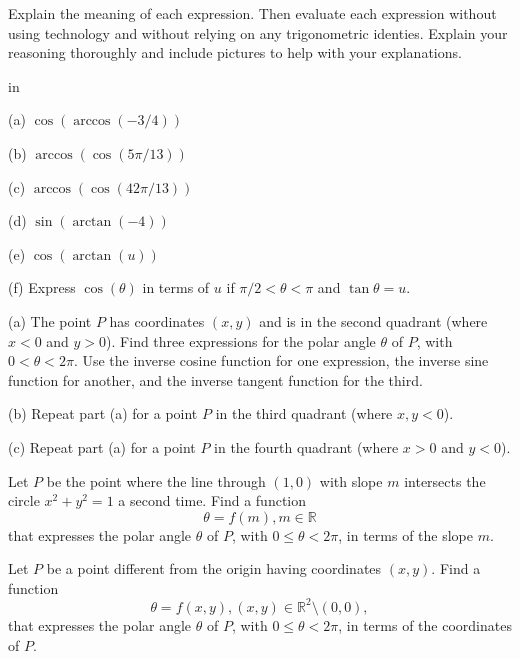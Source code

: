 \documentclass{ximera}
\newcommand{\pskip}{\vskip 0.1 in}
\begin{document}
\begin{question}   \label{Q17:InverseTrig}
Explain the meaning of each expression. Then evaluate each expression without using technology and without relying on any trigonometric identies. Explain your reasoning thoroughly and include pictures to help with your explanations.

\pskip

(a) $\cos (\arccos(-3/4))$ 

(b) $\arccos(\cos (5\pi/13))$

(c) $\arccos(\cos (42\pi/13))$

(d) $\sin(\arctan (-4))$

(e) $\cos(\arctan (u))$

(f) Express $\cos (\theta)$ in terms of $u$  if $\pi/2 < \theta < \pi$ and $\tan \theta=u$.

\end{question} 


\begin{question} \label{Q18:InverseTrig}
(a) The point $P$ has coordinates $(x,y)$ and is in the second quadrant (where $x<0$ and $y>0$). Find three expressions for the polar angle $\theta$ of $P$, with $0 < \theta < 2\pi$. Use the inverse cosine function for one expression, the inverse sine function for another, and the inverse tangent function for the third. 

(b) Repeat part (a) for a point $P$ in the third quadrant (where $x,y<0$).

(c) Repeat part (a) for a point $P$ in the fourth quadrant (where $x>0$ and $y<0$).
\end{question}



\begin{question} \label{Q19:InverseTrig}
Let $P$ be the point where the line through $(1,0)$ with slope $m$ intersects the circle $x^2+y^2=1$ a second time. Find a function 
\[
      \theta = f(m) , m \in \mathbb{R}
\] 
that expresses the polar angle $\theta$ of $P$, with $0 \leq  \theta < 2\pi$, in terms of the slope $m$. 
\end{question}

\begin{question} \label{Q20:InverseTrig}
Let $P$ be a point different from the origin having coordinates $(x,y)$. Find a function 
\[
      \theta = f(x,y) , (x,y) \in \mathbb{R}^2 \setminus {(0,0)} ,
\] 
that expresses the polar angle $\theta$ of $P$, with $0 \leq  \theta < 2\pi$, in terms of the coordinates of $P$.

\end{question}
\end{document}
